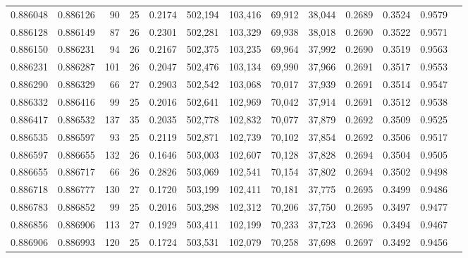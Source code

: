 \begin{tabular}{rrrrrrrrrrrrr}
0.886048 & 0.886126 &    90 &  25 &                                     0.2174 & 502,194 & 103,416 &  69,912 &  38,044 & 0.2689 & 0.3524 & 0.9579 \\
0.886128 & 0.886149 &    87 &  26 &                                     0.2301 & 502,281 & 103,329 &  69,938 &  38,018 & 0.2690 & 0.3522 & 0.9571 \\
0.886150 & 0.886231 &    94 &  26 &                                     0.2167 & 502,375 & 103,235 &  69,964 &  37,992 & 0.2690 & 0.3519 & 0.9563 \\
0.886231 & 0.886287 &   101 &  26 &                                     0.2047 & 502,476 & 103,134 &  69,990 &  37,966 & 0.2691 & 0.3517 & 0.9553 \\
0.886290 & 0.886329 &    66 &  27 &                                     0.2903 & 502,542 & 103,068 &  70,017 &  37,939 & 0.2691 & 0.3514 & 0.9547 \\
0.886332 & 0.886416 &    99 &  25 &                                     0.2016 & 502,641 & 102,969 &  70,042 &  37,914 & 0.2691 & 0.3512 & 0.9538 \\
0.886417 & 0.886532 &   137 &  35 &                                     0.2035 & 502,778 & 102,832 &  70,077 &  37,879 & 0.2692 & 0.3509 & 0.9525 \\
0.886535 & 0.886597 &    93 &  25 &                                     0.2119 & 502,871 & 102,739 &  70,102 &  37,854 & 0.2692 & 0.3506 & 0.9517 \\
0.886597 & 0.886655 &   132 &  26 &                                     0.1646 & 503,003 & 102,607 &  70,128 &  37,828 & 0.2694 & 0.3504 & 0.9505 \\
0.886655 & 0.886717 &    66 &  26 &                                     0.2826 & 503,069 & 102,541 &  70,154 &  37,802 & 0.2694 & 0.3502 & 0.9498 \\
0.886718 & 0.886777 &   130 &  27 &                                     0.1720 & 503,199 & 102,411 &  70,181 &  37,775 & 0.2695 & 0.3499 & 0.9486 \\
0.886783 & 0.886852 &    99 &  25 &                                     0.2016 & 503,298 & 102,312 &  70,206 &  37,750 & 0.2695 & 0.3497 & 0.9477 \\
0.886856 & 0.886906 &   113 &  27 &                                     0.1929 & 503,411 & 102,199 &  70,233 &  37,723 & 0.2696 & 0.3494 & 0.9467 \\
0.886906 & 0.886993 &   120 &  25 &                                     0.1724 & 503,531 & 102,079 &  70,258 &  37,698 & 0.2697 & 0.3492 & 0.9456 \\

\end{tabular}

